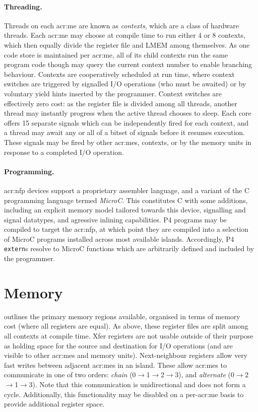 \paragraph{Threading.}
Threads on each \gls{acr:me} are known as \emph{contexts}, which are a class of hardware threads.
Each \gls{acr:me} may choose at compile time to run either 4 or 8 contexts, which then equally divide the register file and LMEM among themselves.
As one code store is maintained per \gls{acr:me}, all of its child contexts run the same program code though may query the current context number to enable branching behaviour.
Contexts are cooperatively scheduled at run time, where context switches are triggered by signalled I/O operations (who must be awaited) or by voluntary yield hints inserted by the programmer.
Context switches are effectively zero cost: as the register file is divided among all threads, another thread may instantly progress when the active thread chooses to sleep.
Each core offers \num{15} separate signals which can be independently fired for each context, and a thread may await any or all of a bitset of signals before it resumes execution.
These signals may be fired by other \glspl{acr:me}, contexts, or by the memory units in response to a completed I/O operation.

\paragraph{Programming.}
\gls{acr:nfp} devices support a proprietary assembler language, and a variant of the C programming language termed \emph{MicroC}.
This constitutes C with some additions, including an explicit memory model tailored towards this device, signalling and signal datatypes, and agressive inlining capabilities.
P4 programs may be compiled to target the \gls{acr:nfp}, at which point they are compiled into a selection of MicroC programs installed across most available islands.
Accordingly, P4 \texttt{extern}s resolve to MicroC functions which are arbitrarily defined and included by the programmer.

\section{Memory}
 outlines the primary memory regions available, organised in terms of memory cost (where all registers are equal).
As above, these register files are split among all contexts at compile time.
Xfer registers are not usable outside of their purpose as holding space for the source and destination for I/O operations (and are visible to other \glspl{acr:me} and memory units).
Next-neighbour registers allow very fast writes between adjacent \glspl{acr:me} in an island.
These allow \glspl{acr:me} to communicate in one of two orders: \emph{chain} (0$\rightarrow$1$\rightarrow$2$\rightarrow$3), and \emph{alternate} (0$\rightarrow$2$\rightarrow$1$\rightarrow$3).
Note that this communication is unidirectional and does not form a cycle.
Additionally, this functionality may be disabled on a per-\gls{acr:me} basis to provide additional register space.

